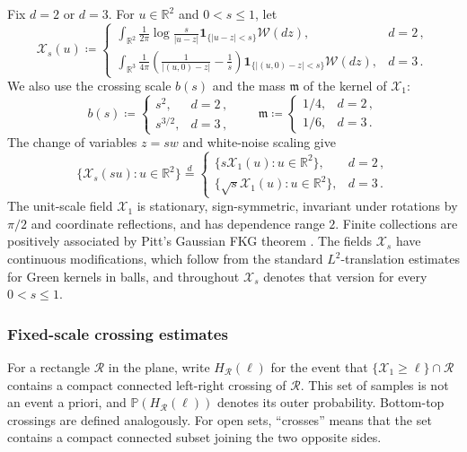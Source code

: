 \documentclass[11pt]{amsart}
\theoremstyle{plain}
\theoremstyle{definition}
\newcommand{\R}{\mathbb{R}}
\renewcommand{\P}{\mathbb{P}}
\begin{document}
Fix $d=2$ or $d=3$. For $u\in\R^2$ and $0<s\leq1$, let
\[
    \mathcal X_s(u)\coloneqq
    \begin{cases}
    \displaystyle
    \int_{\R^2}
    \frac1{2\pi}\log\frac{s}{|u-z|}
    \mathbf 1_{\{|u-z|<s\}}\mathcal W(dz),& d=2\, ,\\[4mm]
    \displaystyle
    \int_{\R^3}
    \frac1{4\pi}\left(\frac1{|(u,0)-z|}-\frac1s\right)
    \mathbf 1_{\{|(u,0)-z|<s\}}\mathcal W(dz),& d=3\, .
    \end{cases}
\]
We also use the crossing scale $b(s)$ and the mass $\mathfrak m$ of the kernel of $\mathcal X_1$:
\begin{equation}\label{eq:continuum-crossing-scale}
    b(s)\coloneqq
    \begin{cases}
    s^2,& d=2\, ,\\
    s^{3/2},& d=3\, ,
    \end{cases}
    \qquad
    \mathfrak m\coloneqq
    \begin{cases}
    1/4,& d=2\, ,\\
    1/6,& d=3\, .
    \end{cases}
\end{equation}
The change of variables $z=sw$ and white-noise scaling give
\begin{equation}\label{eq:cont-field-scaling}
    \{\mathcal X_s(su):u\in\R^2\}\stackrel d=
    \begin{cases}
    \{s\mathcal X_1(u):u\in\R^2\},& d=2\, ,\\
    \{\sqrt{s}\mathcal X_1(u):u\in\R^2\},& d=3\, .
    \end{cases}
\end{equation}
The unit-scale field $\mathcal X_1$ is stationary, sign-symmetric, invariant under
rotations by $\pi/2$ and coordinate reflections, and has dependence range $2$. Finite collections are positively associated by Pitt's Gaussian FKG theorem \citep[Theorem, p.~496, Eq.~(1)]{Pitt}. The fields $\mathcal X_s$ have continuous modifications, which follow from the standard $L^2$-translation estimates for Green kernels in balls, and throughout $\mathcal X_s$ denotes that version for every $0<s\leq1$.

\subsubsection{Fixed-scale crossing estimates}\label{ssec:fixed-scale-crossings}

For a rectangle $\mathcal R$ in the plane, write $H_{\mathcal R}(\ell)$ for the
event that $\{\mathcal X_1\geq\ell\}\cap\mathcal R$ contains a compact connected
left-right crossing of $\mathcal R$. This set of samples is not an event a
priori, and $\P(H_{\mathcal R}(\ell))$ denotes its outer probability.
Bottom-top crossings are defined
analogously. For open sets, ``crosses'' means that the set contains a compact
connected subset joining the two opposite sides.
\end{document}
